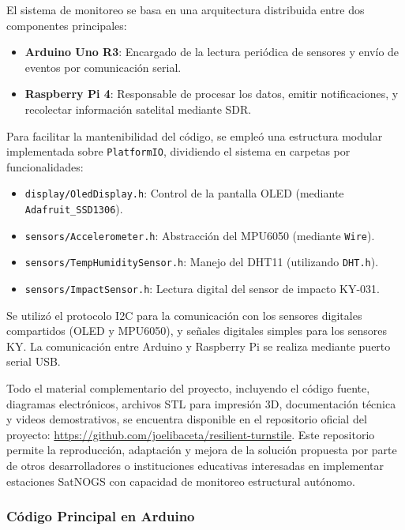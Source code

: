 \documentclass[conference]{IEEEtran}
\begin{document}
El sistema de monitoreo se basa en una arquitectura distribuida entre dos componentes principales:

\begin{itemize}
  \item \textbf{Arduino Uno R3}: Encargado de la lectura periódica de sensores y envío de eventos por comunicación serial.
  \item \textbf{Raspberry Pi 4}: Responsable de procesar los datos, emitir notificaciones, y recolectar información satelital mediante SDR.
\end{itemize}

Para facilitar la mantenibilidad del código, se empleó una estructura modular implementada sobre \texttt{PlatformIO}, dividiendo el sistema en carpetas por funcionalidades:

\begin{itemize}
  \item \texttt{display/OledDisplay.h}: Control de la pantalla OLED (mediante \texttt{Adafruit\_SSD1306}).
  \item \texttt{sensors/Accelerometer.h}: Abstracción del MPU6050 (mediante \texttt{Wire}).
  \item \texttt{sensors/TempHumiditySensor.h}: Manejo del DHT11 (utilizando \texttt{DHT.h}).
  \item \texttt{sensors/ImpactSensor.h}: Lectura digital del sensor de impacto KY-031.
\end{itemize}

Se utilizó el protocolo I2C para la comunicación con los sensores digitales compartidos (OLED y MPU6050), y señales digitales simples para los sensores KY. La comunicación entre Arduino y Raspberry Pi se realiza mediante puerto serial USB.

Todo el material complementario del proyecto, incluyendo el código fuente, diagramas electrónicos, archivos STL para impresión 3D, documentación técnica y videos demostrativos, se encuentra disponible en el repositorio oficial del proyecto: \url{https://github.com/joelibaceta/resilient-turnstile}. Este repositorio permite la reproducción, adaptación y mejora de la solución propuesta por parte de otros desarrolladores o instituciones educativas interesadas en implementar estaciones SatNOGS con capacidad de monitoreo estructural autónomo.

\subsubsection{Código Principal en Arduino}
\end{document}
